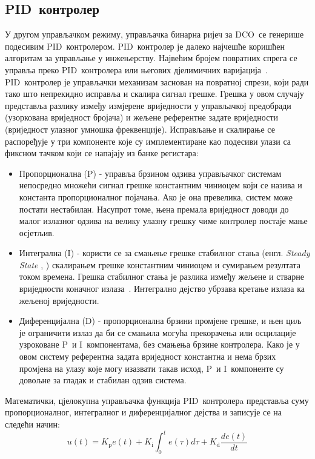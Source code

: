 \documentclass[master]{finthesis}
\makeatletter
\newcommand*{\engl}[2][\@empty]{%
    \edef\theacronym{#1}%
    (енгл. \foreignlanguage{english}{\emph{#2}%
    \ifx\theacronym\@empty \else , #1\fi})%
}
\def \DCO  {DCO} %
\def \PID  {PID} %
\def \P    {P}   %
\def \I    {I}   %
\def \D    {D}   %
\makeatother
\begin{document}
\subsection{\PID\ контролер} \label{section:pid}
У другом управљачком режиму, управљачка бинарна ријеч за \DCO\ се генерише подесивим \PID\ контролером. \PID\ контролер је далеко најчешће коришћен алгоритам за управљање у инжењерству. Највећим бројем повратних спрега се управља преко \PID\ контролера или његових дјелимичних варијација~\cite{Astrom:PID_1995}. \PID\ контролер је управљачки механизам заснован на повратној спрези, који ради тако што непрекидно исправља и скалира сигнал грешке. Грешка у овом случају представља разлику између измјерене вриједности у управљачкој предобради (узоркована вриједност бројача) и жељене референтне задате вриједности (вриједност улазног умношка фреквенције). Исправљање и скалирање се распоређује у три компоненте које су имплементиране као подесиви улази са фиксном тачком који се напајају из банке регистара: 
\begin{itemize}
	\item Пропорционална (\P) - управља брзином одзива управљачког системам непосредно множећи сигнал грешке константним чиниоцем који се назива и константа пропорционалног појачања. Ако је она превелика, систем може постати нестабилан. Насупрот томе, њена премала вриједност доводи до малог излазног одзива на велику улазну грешку чиме контролер постаје мање осјетљив. 
	\item Интегрална (\I) - користи се за смањење грешке стабилног стања \engl{Steady State} скалирањем грешке константним чиниоцем и сумирањем резултата током времена. Грешка стабилног стања је разлика између жељене и стварне вриједности коначног излаза~\cite{Liptak:PROCESS_CONTROL_2006}. Интегрално дејство убрзава кретање излаза ка жељеној вриједности.
	\item Диференцијална (\D) - пропорционална брзини промјене грешке, и њен циљ је ограничити излаз да би се смањила могућа прекорачења или осцилације узроковане \P\ и \I\ компонентама, без смањења брзине контролера. Како је у овом систему референтна задата вриједност константна и нема брзих промјена на улазу које могу изазвати такав исход, \P\ и \I\ компоненте су довољне за гладак и стабилан одзив система. \par
\end{itemize}
Математички, цјелокупна управљачка функција \PID\ контролерa представља суму пропорционалног, интегралног и диференцијалног дејства и записује се на следећи начин:
\begin{equation} 
	\label{eq_pid_1}
	u(t)= K_\text{p}e(t) + K_\text{i}\int_{0}^{t}e(\tau)d\tau + K_\text{d}\frac{de(t)}{dt}
\end{equation}
\end{document}
